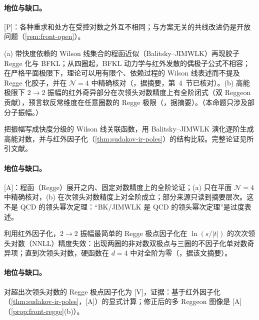 \paragraph{地位与缺口。}[P]：各种重求和处方在受控对数之外互不相同；与方案无关的共线改进仍是开放问题（\cref{rem:front-open}）。

\begin{proposition}\label{prop:front-regge}\hfill\break
(a) 带快度依赖的 Wilson 线集合的程函近似（Balitsky--JIMWLK）再现胶子 Regge 化与 BFKL；从四圈起，BFKL 动力学与红外发散的偶极子公式不相容；在严格平面极限下，理论可以用有限个、依赖过程的 Wilson 线表述而不提及 Regge 化胶子，并在 $\mathcal N=4$ 中精确核对（\cite{Caron-Huot:2013fea}，据摘要，第~4~节已核对）。(b) 高能极限下 $2\to2$ 振幅的红外奇异部分在次领头对数精度上有全阶闭式（双 Reggeon 贡献），预言软反常维度在任意圈数的 Regge 极限（\cite{Caron-Huot:2017zfo}，据摘要）。（本命题只涉及部分子振幅。）
\end{proposition}

\begin{proofsketch}
把振幅写成快度分级的 Wilson 线关联函数，用 Balitsky--JIMWLK 演化逐阶生成高能对数，并与红外因子化（\cref{thm:sudakov-ir-poles}）的结构比较。完整论证见所引文献。
\end{proofsketch}

\paragraph{地位与缺口。}[A]：程函（Regge）展开之内、固定对数精度上的全阶论证；(a) 只在平面 $\mathcal N=4$ 中精确核对，(b) 在次领头对数精度上对全阶成立；部分来源只读到摘要层次。这不是 QCD 的领头幂次定理：“BK/JIMWLK 是 QCD 的领头幂次定理”是过度表述。

\begin{proposition}\label{prop:front-regge-pole}
利用红外因子化，$2\to2$ 振幅最简单的 Regge 极点因子化在 $\ln(s/|t|)$ 的次次领头对数（NNLL）精度失效：出现两圈的非对数双极点与三圈的不因子化单对数奇异项；直到次领头对数，硬函数在 $d=4$ 中对全阶为零（\cite{DelDuca:2013ara,DelDuca:2014cya}，据该文摘要）。
\end{proposition}

\paragraph{地位与缺口。}对超出次领头对数的 Regge 极点因子化为 [V]，证据：基于红外因子化（\cref{thm:sudakov-ir-poles}，[A]）的显式计算；修正后的多 Reggeon 图像是 [A]（\cref{prop:front-regge}(b)）。

